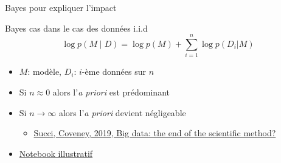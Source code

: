\documentclass[presentation, aspectratio=169]{beamer}
\begin{document}
\begin{frame}{Bayes pour expliquer l'impact}
  \begin{block}{Bayes cas dans le cas des données i.i.d}
    \begin{equation*}
      \log p(M\mid D) = \log p(M) + \sum_{i=1}^n \log p(D_i|M)
    \end{equation*}
    \begin{itemize}
    \item $M$: modèle, $D_i$: $i$-ème données sur $n$
    \item Si $n\approx 0$ alors l'\textit{a priori} est prédominant
    \item Si $n\to\infty$ alors l'\textit{a priori} devient
      négligeable
      \begin{itemize}
      \item \href{https://doi.org/10.1098/rsta.2018.0145}{Succi, Coveney, 2019, Big data: the end of the scientific method?}
      \end{itemize}
    \item
      \href{https://github.com/alban-goupil/jc-fare-2025/blob/main/notebooks/5-observations.ipynb}{Notebook
        illustratif}
    \end{itemize}
  \end{block}
\end{frame}
\end{document}
